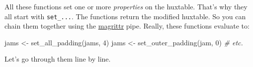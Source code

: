 \documentclass[
]{article}
\newenvironment{Shaded}{\begin{snugshade}}{\end{snugshade}}
\newcommand{\CommentTok}[1]{\textcolor[rgb]{0.56,0.35,0.01}{\textit{#1}}}
\newcommand{\DecValTok}[1]{\textcolor[rgb]{0.00,0.00,0.81}{#1}}
\newcommand{\FunctionTok}[1]{\textcolor[rgb]{0.00,0.00,0.00}{#1}}
\newcommand{\NormalTok}[1]{#1}
\newcommand{\OtherTok}[1]{\textcolor[rgb]{0.56,0.35,0.01}{#1}}
\begin{document}
\FloatBarrier

All these functions set one or more \emph{properties} on the huxtable.
That's why they all start with \texttt{set\_...}. The functions return
the modified huxtable. So you can chain them together using the
\href{https://magrittr.tidyverse.org/}{magrittr} pipe. Really, these
functions evaluate to:

\begin{Shaded}
\begin{Highlighting}[]
\NormalTok{jams }\OtherTok{\textless{}{-}} \FunctionTok{set\_all\_padding}\NormalTok{(jams, }\DecValTok{4}\NormalTok{)}
\NormalTok{jams }\OtherTok{\textless{}{-}} \FunctionTok{set\_outer\_padding}\NormalTok{(jam, }\DecValTok{0}\NormalTok{)}
\CommentTok{\# etc.}
\end{Highlighting}
\end{Shaded}

\FloatBarrier

Let's go through them line by line.
\end{document}
